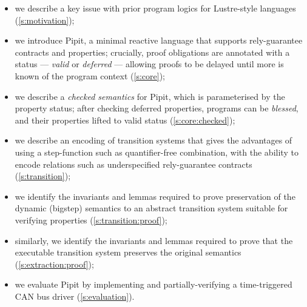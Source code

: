 \begin{itemize}
  \item we describe a key issue with prior program logics for Lustre-style languages (\autoref{s:motivation});
  \item we introduce Pipit, a minimal reactive language that supports rely-guarantee contracts and properties; crucially, proof obligations are annotated with a status --- \emph{valid} or \emph{deferred} --- allowing proofs to be delayed until more is known of the program context (\autoref{s:core});
  \item we describe a \emph{checked semantics} for Pipit, which is parameterised by the property status; after checking deferred properties, programs can be \emph{blessed}, and their properties lifted to valid status (\autoref{s:core:checked});
  \item we describe an encoding of transition systems that gives the advantages of using a step-function such as quantifier-free combination, with the ability to encode relations such as underspecified rely-guarantee contracts (\autoref{s:transition});
  \item we identify the invariants and lemmas required to prove preservation of the dynamic (bigstep) semantics to an abstract transition system suitable for verifying properties (\autoref{s:transition:proof});
  \item similarly, we identify the invariants and lemmas required to prove that the executable transition system preserves the original semantics (\autoref{s:extraction:proof});
  \item we evaluate Pipit by implementing and partially-verifying a time-triggered CAN bus driver (\autoref{s:evaluation}).
\end{itemize}


